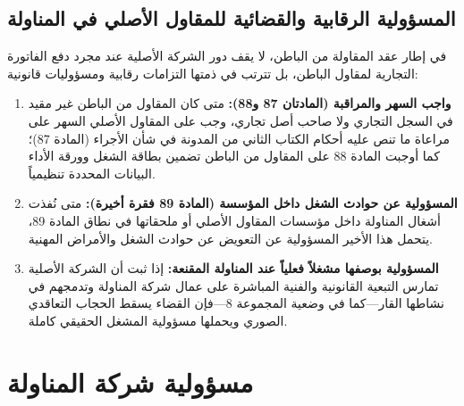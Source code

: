 \subsection{المسؤولية الرقابية والقضائية للمقاول الأصلي في المناولة}
في إطار عقد المقاولة من الباطن، لا يقف دور الشركة الأصلية عند مجرد دفع الفاتورة التجارية لمقاول الباطن، بل تترتب في ذمتها التزامات رقابية ومسؤوليات قانونية:
\begin{enumerate}[leftmargin=*, itemsep=5pt]
    \item \textbf{واجب السهر والمراقبة (المادتان \textenglish{87} و\textenglish{88}):} متى كان المقاول من الباطن غير مقيد في السجل التجاري ولا صاحب أصل تجاري، وجب على المقاول الأصلي السهر على مراعاة ما تنص عليه أحكام الكتاب الثاني من المدونة في شأن الأجراء (المادة \textenglish{87})؛ كما أوجبت المادة \textenglish{88} على المقاول من الباطن تضمين بطاقة الشغل وورقة الأداء البيانات المحددة تنظيمياً.
    \item \textbf{المسؤولية عن حوادث الشغل داخل المؤسسة (المادة \textenglish{89} فقرة أخيرة):} متى نُفذت أشغال المناولة داخل مؤسسات المقاول الأصلي أو ملحقاتها في نطاق المادة \textenglish{89}، يتحمل هذا الأخير المسؤولية عن التعويض عن حوادث الشغل والأمراض المهنية.
    \item \textbf{المسؤولية بوصفها مشغلاً فعلياً عند المناولة المقنعة:} إذا ثبت أن الشركة الأصلية تمارس التبعية القانونية والفنية المباشرة على عمال شركة المناولة وتدمجهم في نشاطها القار—كما في وضعية المجموعة \textenglish{8}—فإن القضاء يسقط الحجاب التعاقدي الصوري ويحملها مسؤولية المشغل الحقيقي كاملة.
\end{enumerate}

\section{مسؤولية شركة المناولة}

